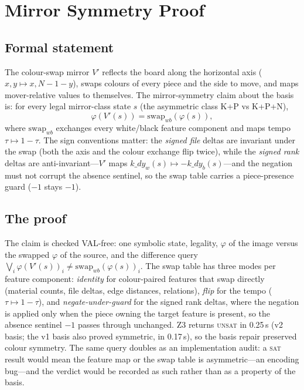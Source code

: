 \documentclass[conference]{IEEEtran}
\begin{document}
\section{Mirror Symmetry Proof}
\label{sec:mirror}

\subsection{Formal statement}
The colour-swap mirror $V'$ reflects the board along the horizontal axis
($x, y \mapsto x, N{-}1{-}y$), swaps colours of every piece and the side to
move, and maps mover-relative values to themselves. The mirror-symmetry
claim about the basis is: for every legal mirror-class state $s$ (the
asymmetric class K+P vs K+P+N),
\begin{equation}
\varphi(V'(s)) = \mathrm{swap}_{wb}(\varphi(s)),
\label{eq:mirror}
\end{equation}
where $\mathrm{swap}_{wb}$ exchanges every white/black feature component
and maps tempo $\tau \mapsto 1 - \tau$. The sign conventions matter: the
\emph{signed file} deltas are invariant under the swap (both the axis and
the colour exchange flip twice), while the \emph{signed rank} deltas are
anti-invariant---$V'$ maps $k\_dy_w(s) \mapsto -k\_dy_b(s)$---and the
negation must not corrupt the absence sentinel, so the swap table carries a
piece-presence guard ($-1$ stays $-1$).

\subsection{The proof}
The claim is checked VAL-free: one symbolic state, legality, $\varphi$ of
the image versus the swapped $\varphi$ of the source, and the difference
query $\bigvee_i \varphi(V'(s))_i \neq \mathrm{swap}_{wb}(\varphi(s))_i$.
The swap table has three modes per feature component: \emph{identity} for
colour-paired features that swap directly (material counts, file deltas,
edge distances, relations), \emph{flip} for the tempo ($\tau \mapsto 1-\tau$),
and \emph{negate-under-guard} for the signed rank deltas, where the negation
is applied only when the piece owning the target feature is present, so
the absence sentinel $-1$ passes through unchanged. Z3 returns
\textsc{unsat} in 0.25\,s (v2 basis; the v1 basis also proved
symmetric, in 0.17\,s), so the basis repair preserved colour symmetry. The
same query doubles as an implementation audit: a \textsc{sat} result would
mean the feature map or the swap table is asymmetric---an encoding bug---and
the verdict would be recorded as such rather than as a property of the
basis.
\end{document}
